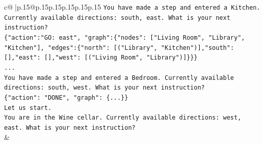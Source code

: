 \documentclass{article}
\begin{document}
{\begin{supertabular}{c@{$\;$}|p{.15\linewidth}@{}p{.15\linewidth}p{.15\linewidth}p{.15\linewidth}p{.15\linewidth}p{.15\linewidth}}
{{{\texttt{You have made a step and entered a Kitchen. Currently available directions: south, east. What is your next instruction?} \\
\texttt{\{"action":"GO: east", "graph":\{"nodes": {[}"Living Room", "Library", "Kitchen"{]}, "edges":\{"north": {[}("Library", "Kitchen"){]},"south": {[}{]},"east": {[}{]},"west": {[}("Living Room", "Library"){]}\}\}\}} \\
\texttt{...} \\
\texttt{You have made a step and entered a Bedroom. Currently available directions: south, west. What is your next instruction?} \\
\texttt{\{"action": "DONE", "graph": \{...\}\}} \\
\texttt{Let us start.} \\
\texttt{You are in the Wine cellar. Currently available directions: west, east. What is your next instruction?} \\
            }
        }
    }
    & \\ \\


\end{supertabular}}
\end{document}
